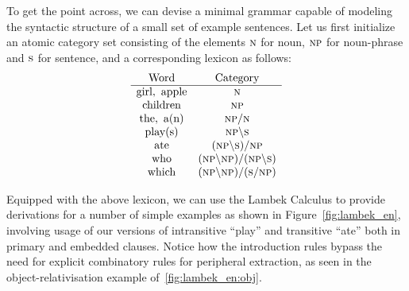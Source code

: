 To get the point across, we can devise a minimal grammar capable of modeling the syntactic structure of a small set of example sentences.
 Let us first initialize an atomic category set consisting of the elements $\textsc{n}$ for noun, $\textsc{np}$ for noun-phrase and $\textsc{s}$ for sentence, and a corresponding lexicon as follows:
 \[
 \begin{array}{cc}
 \text{Word} & \text{Category} \\
 \hline
 \text{girl}, \ \text{apple} & \textsc{n} \\
 \text{children} & \textsc{np} \\
 \text{the}, \ \text{a(n)} & \textsc{np}/ \textsc{n} \\
 \text{play(s)} & \textsc{np}\backslash \textsc{s} \\
 \text{ate} & (\textsc{np} \backslash \textsc{s}) / \textsc{np} \\ 
 \text{who} & (\textsc{np} \backslash \textsc{np}) / (\textsc{np} \backslash \textsc{s}) \\
 \text{which} & (\textsc{np} \backslash \textsc{np})/(\textsc{s} / \textsc{np})
 \end{array}
 \]

Equipped with the above lexicon, we can use the Lambek Calculus to provide derivations for a number of simple examples as shown in Figure~\ref{fig:lambek_en}, involving usage of our versions of intransitive ``play'' and transitive ``ate'' both in primary and embedded clauses.
Notice how the introduction rules bypass the need for explicit combinatory rules for peripheral extraction, as seen in the object-relativisation example of~\ref{fig:lambek_en:obj}.


